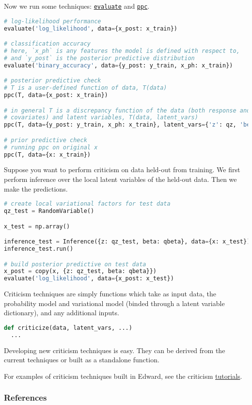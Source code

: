 Now we run some techniques:
\href{/tutorials/point-evaluation}{\texttt{evaluate}}
and
\href{/tutorials/ppc}{\texttt{ppc}}.

\begin{lstlisting}[language=Python]
# log-likelihood performance
evaluate('log_likelihood', data={x_post: x_train})

# classification accuracy
# here, `x_ph` is any features the model is defined with respect to,
# and `y_post` is the posterior predictive distribution
evaluate('binary_accuracy', data={y_post: y_train, x_ph: x_train})

# posterior predictive check
# T is a user-defined function of data, T(data)
ppc(T, data={x_post: x_train})

# in general T is a discrepancy function of the data (both response and
# covariates) and latent variables, T(data, latent_vars)
ppc(T, data={y_post: y_train, x_ph: x_train}, latent_vars={'z': qz, 'beta': qbeta})

# prior predictive check
# running ppc on original x
ppc(T, data={x: x_train})
\end{lstlisting}

Suppose you want to perform criticism on data held-out from training.
We first perform inference over the local latent variables of the
held-out data. Then we make the predictions.

\begin{lstlisting}[language=Python]
# create local variational factors for test data
qz_test = RandomVariable()

x_test = np.array()

inference_test = Inference({z: qz_test, beta: qbeta}, data={x: x_test})
inference_test.run()

# build posterior predictive on test data
x_post = copy(x, {z: qz_test, beta: qbeta}})
evaluate('log_likelihood', data={x_post: x_test})
\end{lstlisting}

Criticism techniques are simply functions which take as input data,
the probability model and variational model (binded through a latent
variable dictionary), and any additional inputs.

\begin{lstlisting}[language=Python]
def criticize(data, latent_vars, ...)
  ...
\end{lstlisting}

Developing new criticism techniques is easy.  They can be derived from
the current techniques or built as a standalone function.

For examples of criticism techniques built in Edward, see the
criticism
\href{/tutorials/}{tutorials}.

\subsubsection{References}\label{references}
